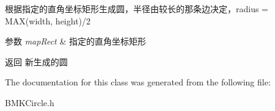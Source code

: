 根据指定的直角坐标矩形生成圆，半径由较长的那条边决定，radius = M\-A\-X(width, height)/2 
\begin{DoxyParams}{参数}
{\em map\-Rect} & 指定的直角坐标矩形 \\
\hline
\end{DoxyParams}
\begin{DoxyReturn}{返回}
新生成的圆 
\end{DoxyReturn}


The documentation for this class was generated from the following file\-:\begin{DoxyCompactItemize}
\item 
B\-M\-K\-Circle.\-h\end{DoxyCompactItemize}
